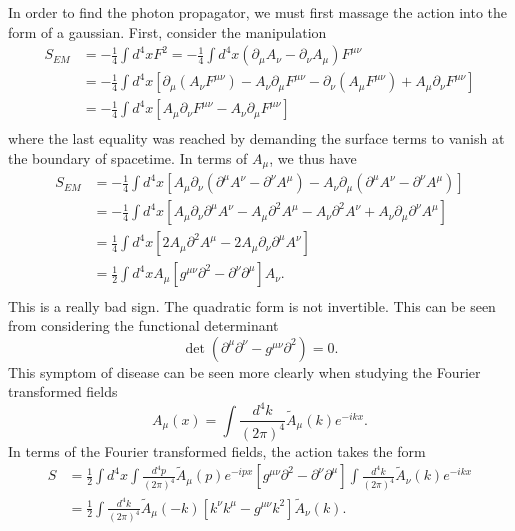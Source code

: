\documentclass[twoside,utf8]{article}
\begin{document}
In order to find the photon propagator, we must first massage the action into the form of a gaussian. First, consider the manipulation
\begin{equation*}
\begin{align}
S_{EM}
&= -\frac{1}{4}\int d^4 x F^2
 = -\frac{1}{4}\int d^4 x (\partial_\mu A_\nu - \partial_\nu A_\mu)F^{\mu\nu} \\
&= -\frac{1}{4}\int d^4 x \left[ \partial_\mu (A_\nu F^{\mu\nu}) - A_\nu \partial_\mu F^{\mu\nu} - \partial_\nu (A_\mu F^{\mu\nu}) + A_\mu \partial_\nu F^{\mu\nu} \right]  \\
&= -\frac{1}{4}\int d^4 x \left[ A_\mu \partial_\nu F^{\mu\nu} - A_\nu \partial_\mu F^{\mu\nu} \right]  \\
\end{align}
\end{equation*}
where the last equality was reached by demanding the surface terms to vanish at the boundary of spacetime. In terms of $A_\mu$, we thus have
\begin{equation*}
\begin{align}
S_{EM}
&= -\frac{1}{4}\int d^4 x \left[
A_\mu \partial_\nu (\partial^\mu A^\nu-\partial^\nu A^\mu)
- A_\nu \partial_\mu (\partial^\mu A^\nu-\partial^\nu A^\mu)
\right] \\
&= -\frac{1}{4}\int d^4 x \left[
 A_\mu \partial_\nu \partial^\mu A^\nu- A_\mu \partial^2 A^\mu
- A_\nu \partial^2 A^\nu + A_\nu \partial_\mu \partial^\nu A^\mu
\right] \\
&= \frac{1}{4}\int d^4 x \left[
 2A_\mu \partial^2 A^\mu- 2A_\mu \partial_\nu \partial^\mu A^\nu
\right] \\
&= \frac{1}{2}\int d^4 x A_\mu \left[
 g^{\mu\nu}\partial^2 - \partial^\nu \partial^\mu
\right] A_\nu. \\
\end{align}
\end{equation*}
This is a really bad sign. The quadratic form is not invertible. This can be seen from considering the functional determinant
\[
\det \left( \partial^\mu \partial^\nu - g^{\mu\nu}\partial^2 \right) = 0.
\]
This symptom of disease can be seen more clearly when studying the Fourier transformed fields
\[
A_\mu(x) = \int \frac{d^4 k}{(2\pi)^4}\tilde{A}_\mu(k)e^{-ikx}.
\]
In terms of the Fourier transformed fields, the action takes the form
\begin{equation*}
\begin{align}
S
&= \frac{1}{2}\int d^4 x \int \frac{d^4 p}{(2\pi)^4}\tilde{A}_\mu(p)e^{-ipx} \left[
 g^{\mu\nu}\partial^2 - \partial^\nu \partial^\mu
\right] \int \frac{d^4 k}{(2\pi)^4}\tilde{A}_\nu(k)e^{-ikx} \\
&= \frac{1}{2}\int \frac{d^4 k}{(2\pi)^4} \tilde{A}_\mu(-k) \left[
 k^\nu k^\mu - g^{\mu\nu} k^2
\right] \tilde{A}_\nu(k).
\end{align}
\end{equation*}
\end{document}
